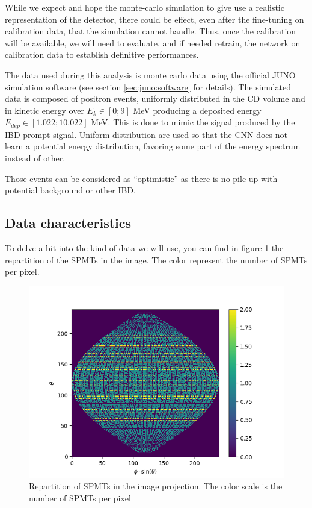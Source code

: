 While we expect and hope the monte-carlo simulation to give use a realistic representation of the detector, there could be effect, even after the fine-tuning on calibration data, that the simulation cannot handle. Thus, once the calibration will be available, we will need to evaluate, and if needed retrain, the network on calibration data to establish definitive performances.

The data used during this analysis is monte carlo data using the official JUNO simulation software (see section \ref{sec:juno:software} for details). The simulated data is composed of positron events, uniformly distributed in the CD volume and in kinetic energy over $E_k \in [0; 9]$ MeV producing a deposited energy $E_{dep} \in [1.022; 10.022]$ MeV. This is done to mimic the signal produced by the IBD prompt signal. Uniform distribution are used so that the CNN does not learn a potential energy distribution, favoring some part of the energy spectrum instead of other.

Those events can be considered as ``optimistic'' as there is no pile-up with potential background or other IBD.

\subsection{Data characteristics}

To delve a bit into the kind of data we will use, you can find in figure \ref{fig:jcnn:pmt_rep} the repartition of the SPMTs in the image. The color represent the number of SPMTs per pixel.

\begin{figure}[ht]
  \centering
  \includegraphics[width=\textwidth]{images/jcnn/pmt_repartition.png}
  \caption{Repartition of SPMTs in the image projection. The color scale is the number of SPMTs per pixel}
  \label{fig:jcnn:pmt_rep}
\end{figure}

